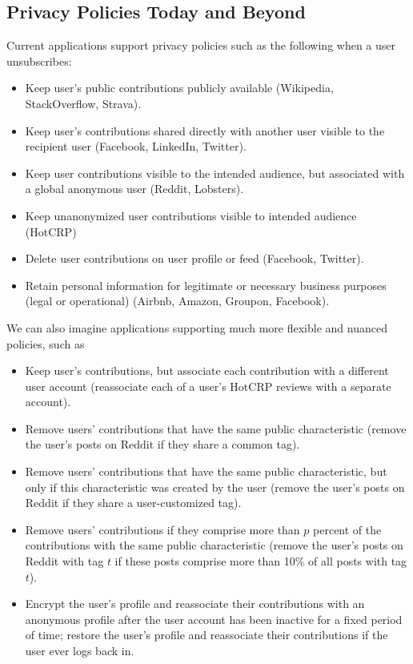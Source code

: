 \subsection{Privacy Policies Today and Beyond}

Current applications support privacy policies such as the following when a user unsubscribes:
\begin{itemize}
    \item Keep user's public contributions publicly available (\eg Wikipedia, StackOverflow,
        Strava).
    \item Keep user's contributions shared directly with another user visible to the recipient user (\eg Facebook,
        LinkedIn, Twitter).
    \item Keep user contributions visible to the intended audience, but associated with a global
        anonymous user (\eg Reddit, Lobsters).
    \item Keep unanonymized user contributions visible to intended audience (\eg HotCRP)
    \item Delete user contributions on user profile or feed (\eg Facebook, Twitter).
    \item Retain personal information for legitimate or necessary business purposes (legal or
        operational) (\eg Airbnb, Amazon, Groupon, Facebook).
\end{itemize}

We can also imagine applications supporting much more flexible and nuanced policies, such as
\begin{itemize}
    \item Keep user's contributions, but associate each contribution with a different user account
        (\eg reassociate each of a user's HotCRP reviews with a separate account).
    \item Remove users' contributions that have the same public characteristic (\eg remove the user's
       posts on Reddit if they share a common tag).
    \item Remove users' contributions that have the same public characteristic, but only if this
        characteristic was created by the user (\eg remove the user's posts on Reddit if they share
        a user-customized tag).  
    \item Remove users' contributions if they comprise more than $p$
            percent of the contributions with the same public characteristic (\eg remove the user's
            posts on Reddit with tag $t$ if these posts comprise more than 10\% of all posts with
            tag $t$).
    \item Encrypt the user's profile and reassociate their contributions with an anonymous
        profile after the user account has been inactive for a fixed period of time;
        restore the user's profile and reassociate their contributions if the user ever logs back in.
\end{itemize}

